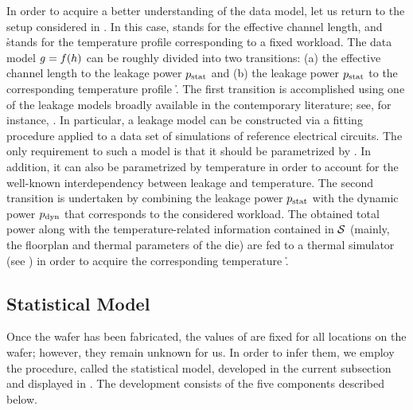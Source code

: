 In order to acquire a better understanding of the data model, let us return to
the setup considered in . In this case, \g stands for the
effective channel length, and \h stands for the temperature profile
corresponding to a fixed workload. The data model $g = f(h)$ can be roughly
divided into two transitions: (a) the effective channel length \g to the leakage
power $p_{\mathrm{stat}}$ and (b) the leakage power $p_{\mathrm{stat}}$ to the corresponding
temperature profile \h. The first transition is accomplished using one of the
leakage models broadly available in the contemporary literature; see, for
instance, \cite{chandrakasan2000, srivastava2010, juan2012}. In particular, a
leakage model can be constructed via a fitting procedure applied to a data set
of  simulations of reference electrical circuits. The only requirement
to such a model is that it should be parametrized by \g. In addition, it can
also be parametrized by temperature in order to account for the well-known
interdependency between leakage and temperature. The second transition is
undertaken by combining the leakage power $p_{\mathrm{stat}}$ with the dynamic power
$p_{\mathrm{dyn}}$ that corresponds to the considered workload. The obtained total
power along with the temperature-related information contained in $\mathcal{S}$
(mainly, the floorplan and thermal parameters of the die) are fed to a thermal
simulator (see ) in order to acquire the
corresponding temperature \h.

\subsection{Statistical Model}

Once the wafer has been fabricated, the values of \g are fixed for all
locations on the wafer; however, they remain unknown for us. In order to infer
them, we employ the procedure, called the statistical model, developed in the
current subsection and displayed in . The development consists
of the five components described below.

